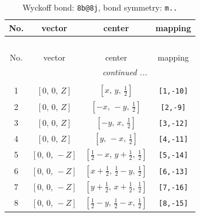 \documentclass[fleqn,8pt]{jsarticle}
\begin{document}
\begin{longtable}{cccc}
\caption{Wyckoff bond: {\tt 8b@8j}, bond symmetry: {\tt m..}}
 \\
 \hline \hline
No. & vector & center & mapping \\ \hline \endfirsthead

\multicolumn{3}{l}{\tablename\ \thetable{}} \\
 \hline \hline
No. & vector & center & mapping \\ \hline \endhead

 \hline \hline
\multicolumn{3}{r}{\footnotesize\it continued ...} \\ \endfoot

 \hline \hline
\multicolumn{3}{r}{} \\ \endlastfoot

1 & $\left[ 0,\, 0,\, Z \right]$ & $\left[ x,\, y,\, \frac{1}{2} \right]$ & {\tt [1,-10]} \\ \hline
2 & $\left[ 0,\, 0,\, Z \right]$ & $\left[ - x,\, - y,\, \frac{1}{2} \right]$ & {\tt [2,-9]} \\ \hline
3 & $\left[ 0,\, 0,\, Z \right]$ & $\left[ - y,\, x,\, \frac{1}{2} \right]$ & {\tt [3,-12]} \\ \hline
4 & $\left[ 0,\, 0,\, Z \right]$ & $\left[ y,\, - x,\, \frac{1}{2} \right]$ & {\tt [4,-11]} \\ \hline
5 & $\left[ 0,\, 0,\, - Z \right]$ & $\left[ \frac{1}{2} - x,\, y + \frac{1}{2},\, \frac{1}{2} \right]$ & {\tt [5,-14]} \\ \hline
6 & $\left[ 0,\, 0,\, - Z \right]$ & $\left[ x + \frac{1}{2},\, \frac{1}{2} - y,\, \frac{1}{2} \right]$ & {\tt [6,-13]} \\ \hline
7 & $\left[ 0,\, 0,\, - Z \right]$ & $\left[ y + \frac{1}{2},\, x + \frac{1}{2},\, \frac{1}{2} \right]$ & {\tt [7,-16]} \\ \hline
8 & $\left[ 0,\, 0,\, - Z \right]$ & $\left[ \frac{1}{2} - y,\, \frac{1}{2} - x,\, \frac{1}{2} \right]$ & {\tt [8,-15]} \\
\end{longtable}
\renewcommand{\arraystretch}{1.2}
\end{document}
